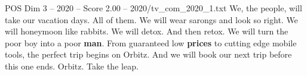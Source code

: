 \begin{textsample}{POS Dim 3 – 2020 – Score 2.00 – 2020/tv\_com\_2020\_1.txt}  \label{ex:f3_pos_068}
We, the people, will take our vacation days.
All of them.
We will wear sarongs and look so right.
We will honeymoon like rabbits.
We will detox.
And then retox.
We will turn the poor boy into a poor \textbf{man}.
From guaranteed low \textbf{prices} to cutting edge mobile tools, the perfect trip begins on Orbitz.
And we will book our next trip before this one ends.
Orbitz.
Take the leap.

\end{textsample}
